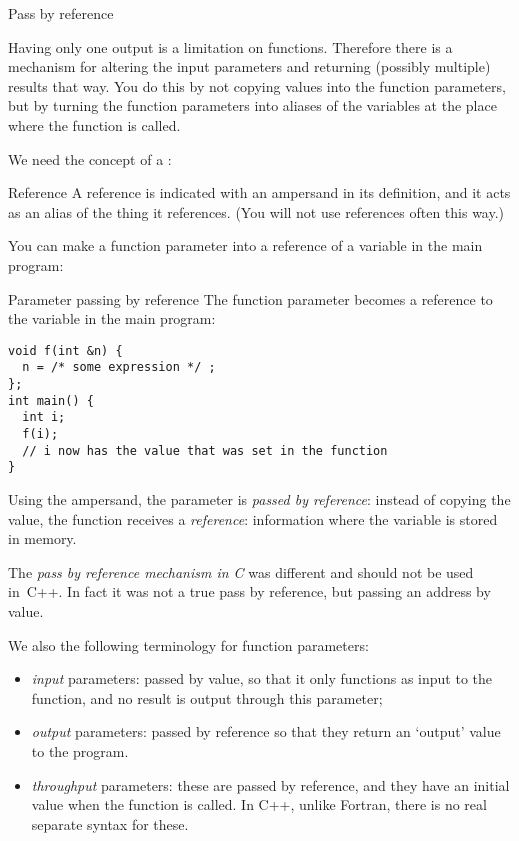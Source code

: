  {Pass by reference}
\label{sec:pass-by-ref}
  
Having only one output is a limitation on functions. Therefore there
is a mechanism for altering the input parameters and returning
(possibly multiple) results that way. You do this by not copying
values into the function parameters, but by turning the function
parameters into aliases of the variables at the place where the
function is called.

We need the concept of a :
\begin{block}{Reference}
  \label{sl:cpp-reference}
  A reference is indicated with an ampersand in its definition, and it
  acts as an alias of the thing it references.
  (You will not use references often this way.)
\end{block}

You can make a function parameter into a reference of a variable in
the main program:

\begin{block}{Parameter passing by reference}
  \label{sl:pass-by-ref}
The function parameter  becomes a reference to the variable 
in the main program:
\begin{lstlisting}
void f(int &n) {
  n = /* some expression */ ;
};
int main() {
  int i;
  f(i);
  // i now has the value that was set in the function
}
\end{lstlisting}
\end{block}

Using the ampersand, the parameter is
\emph{passed by reference}:
instead of copying the value, the function receives a \emph{reference}:
information where the variable is stored in memory.

\begin{remark}
  The \emph{pass by reference mechanism in C}%
  was different and should not be used in~C++. In fact it was not a
  true pass by reference, but passing an address by value.
\end{remark}

We also the following terminology for function parameters:
\begin{itemize}
\item \emph{input} parameters: passed by
  value, so that it only functions as input to the function, and no
  result is output through this parameter;
\item \emph{output} parameters: passed
  by reference so that they return an `output' value to the program.
\item \emph{throughput} parameters:
  these are passed by reference, and they have an initial value when
  the function is called. In C++, unlike Fortran, there is no real
  separate syntax for these.
\end{itemize}

